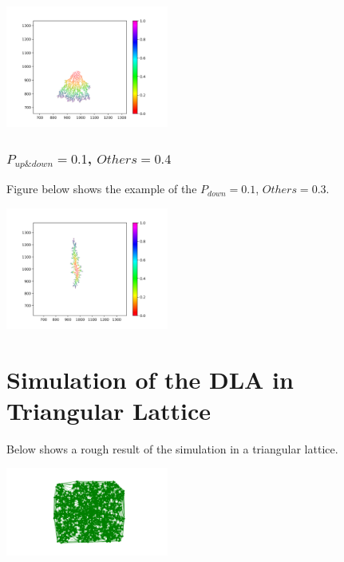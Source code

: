 \documentclass[10pt]{article}
\begin{document}
\begin{center}
	\includegraphics[width=0.4\textwidth]{Figure_19}
\end{center}

\subsubsection{$P_{up \& down} = 0.1$, $Others = 0.4$}

Figure below shows the example of the $P_{down} = 0.1$, $Others = 0.3$.

\begin{center}
	\includegraphics[width=0.4\textwidth]{Figure_20}
\end{center}


\section{Simulation of the DLA in Triangular Lattice}

Below shows a rough result of the simulation in a triangular lattice.

\begin{center}
	\includegraphics[width=0.4\textwidth]{Figure_18}
\end{center}
\end{document}
